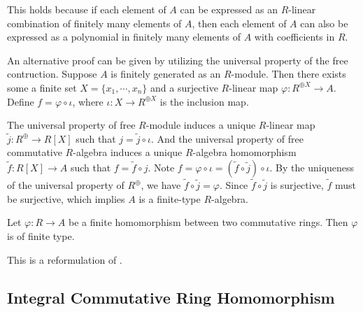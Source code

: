 \begin{prf}
    This holds because if each element of $A$ can be expressed as an $R$-linear combination of finitely many elements of $A$, then each element of $A$ can also be expressed as a polynomial in finitely many elements of $A$ with coefficients in $R$.

    An alternative proof can be given by utilizing the universal property of the free contruction. Suppose $A$ is finitely generated as an $R$-module. Then there exists some a finite set $X=\{x_1,\cdots,x_n\}$ and a surjective $R$-linear map $\varphi:R^{\oplus X}\to A$. Define $f=\varphi\circ \iota$, where $\iota:X\to R^{\oplus X}$ is the inclusion map. 
     \begin{center}
    \end{center}
    The universal property of free $R$-module induces a unique $R$-linear map $\widetilde{j}:R^{\oplus}\to R[X]$ such that $j=\widetilde{j}\circ \iota$. And the universal property of free commutative $R$-algebra induces a unique $R$-algebra homomorphism $\widetilde{f}:R[X]\to A$ such that $f=\widetilde{f}\circ j$. Note $f=\varphi\circ \iota=\left(\widetilde{f}\circ \widetilde{j}\right)\circ \iota$. By the uniqueness of the universal property of $R^{\oplus}$, we have $\widetilde{f}\circ \widetilde{j}=\varphi$. Since $\widetilde{f}\circ \widetilde{j}$ is surjective, $\widetilde{f}$ must be surjective, which implies $A$ is a finite-type $R$-algebra.
\end{prf}

\begin{corollary}{}{}
    Let $\varphi:R\to A$ be a finite homomorphism between two commutative rings. Then $\varphi$ is of finite type.
\end{corollary}
\begin{prf}
    This is a reformulation of .
\end{prf}

\subsection{Integral Commutative Ring Homomorphism}

